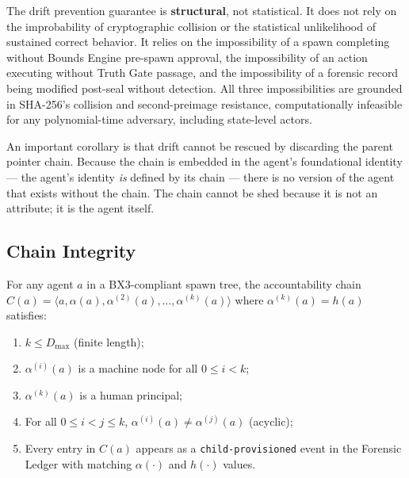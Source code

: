 The drift prevention guarantee is \textbf{structural}, not statistical. It does not rely on the improbability of cryptographic collision or the statistical unlikelihood of sustained correct behavior. It relies on the impossibility of a spawn completing without Bounds Engine pre-spawn approval, the impossibility of an action executing without Truth Gate passage, and the impossibility of a forensic record being modified post-seal without detection. All three impossibilities are grounded in SHA-256's collision and second-preimage resistance, computationally infeasible for any polynomial-time adversary, including state-level actors.

An important corollary is that drift cannot be rescued by discarding the parent pointer chain. Because the chain is embedded in the agent's foundational identity — the agent's identity \emph{is} defined by its chain — there is no version of the agent that exists without the chain. The chain cannot be shed because it is not an attribute; it is the agent itself.

\subsection{Chain Integrity}

\begin{property}
\label{prop:chain-integrity}
For any agent $a$ in a BX3-compliant spawn tree, the accountability chain $C(a) = \langle a, \alpha(a), \alpha^{(2)}(a), \ldots, \alpha^{(k)}(a) \rangle$ where $\alpha^{(k)}(a) = h(a)$ satisfies:
\begin{enumerate}
  \item $k \leq D_{\max}$ (finite length);
  \item $\alpha^{(i)}(a)$ is a machine node for all $0 \leq i < k$;
  \item $\alpha^{(k)}(a)$ is a human principal;
  \item For all $0 \leq i < j \leq k$, $\alpha^{(i)}(a) \neq \alpha^{(j)}(a)$ (acyclic);
  \item Every entry in $C(a)$ appears as a \texttt{child-provisioned} event in the Forensic Ledger with matching $\alpha(\cdot)$ and $h(\cdot)$ values.
\end{enumerate}
\end{property}


